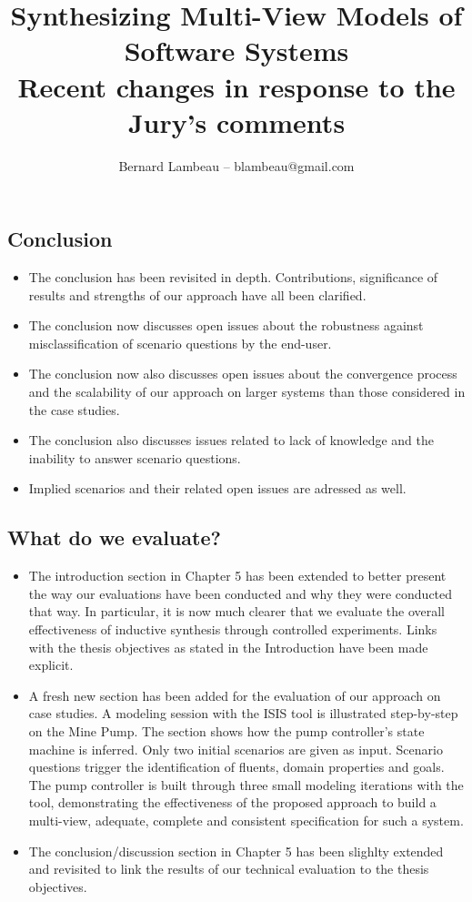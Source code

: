 \documentclass[11pt,oneside,a4paper]{article}
\title{Synthesizing Multi-View Models of \\ Software Systems \\
       Recent changes in response to the Jury's comments}
\author{Bernard Lambeau -- blambeau@gmail.com}
\begin{document}
\maketitle

\subsection*{Conclusion}

\begin{itemize}
\item The conclusion has been revisited in depth. Contributions, significance of results and strengths of our approach have all been clarified.
\item The conclusion now discusses open issues about the robustness against misclassification of scenario questions by the end-user.
\item The conclusion now also discusses open issues about the convergence process and the scalability of our approach on larger systems than those considered in the case studies.
\item The conclusion also discusses issues related to lack of knowledge and the inability to answer scenario questions.
\item Implied scenarios and their related open issues are adressed as well.
\end{itemize}

\subsection*{What do we evaluate?}

\begin{itemize}
\item The introduction section in Chapter 5 has been extended to better present the way our evaluations have been conducted and why they were conducted that way. In particular, it is now much clearer that we evaluate the overall effectiveness of inductive synthesis through controlled experiments. Links with the thesis objectives as stated in the Introduction have been made explicit.
\item A fresh new section has been added for the evaluation of our approach on case studies. A modeling session with the ISIS tool is illustrated step-by-step on the Mine Pump. The section shows how the pump controller's state machine is inferred. Only two initial scenarios are given as input. Scenario questions trigger the identification of fluents, domain properties and goals. The pump controller is built through three small modeling iterations with the tool, demonstrating the effectiveness of the proposed approach to build a multi-view, adequate, complete and consistent specification for such a system.
\item The conclusion/discussion section in Chapter 5 has been slighlty extended and revisited to link the results of our technical evaluation to the thesis objectives.
\end{itemize}
\end{document}
